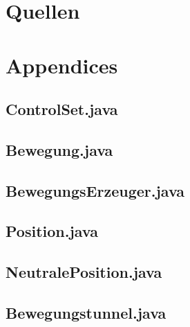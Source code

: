 \documentclass[11pt,a4paper,oneside]{article}
\begin{document}
\section{Quellen}
{}


\section{Appendices}
\subsection*{ControlSet.java}
\subsection*{Bewegung.java}
\subsection*{BewegungsErzeuger.java}
\subsection*{Position.java}
\subsection*{NeutralePosition.java}
\subsection*{Bewegungstunnel.java}
\end{document}
